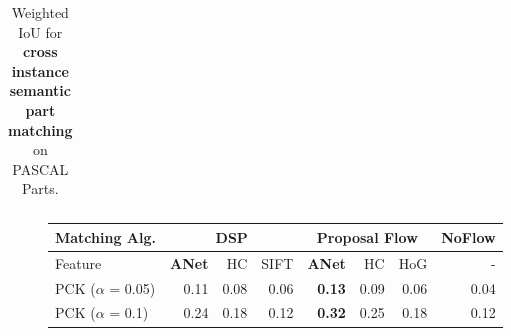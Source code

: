 \documentclass[10pt,twocolumn,letterpaper]{article}
\def\methodname{ANet\xspace}
\begin{document}
\begin{table*}[t]
\begin{tabular}{laccccccccccccc}
\end{tabular}
\vspace{-0.2cm}
\caption{Weighted IoU for \textbf{cross instance semantic part matching} on PASCAL Parts.}%
\label{tab:transferpascalparts}
\vspace{-0.2cm}
\end{table*}\begin{figure}
\centering
\scriptsize
\begin{tabular}{l|rrr|rrr|r} 
\hline
Matching Alg.         & \multicolumn{3}{c|}{DSP}             & \multicolumn{3}{c|}{Proposal Flow}                                        & NoFlow  \\ \hline
Feature               &    \textbf{\methodname}  & HC   & SIFT        & \textbf{\methodname}                        & HC      & HoG    & -       \\ \hline
PCK ($\alpha$ = 0.05) &    0.11         & 0.08 & 0.06        & \textbf{0.13}                      & 0.09    & 0.06   & 0.04    \\
PCK ($\alpha$ = 0.1)  &    0.24         & 0.18 & 0.12        & \textbf{0.32}                      & 0.25    & 0.18   & 0.12    \\ \hline
\end{tabular}
\label{tab:transferanimals}
\vspace{0.2cm}

\end{figure}
\end{document}
